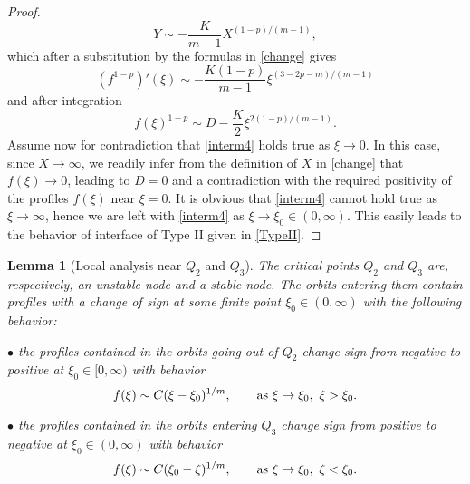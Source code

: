 \documentclass[a4paper,11pt]{article}
\newtheorem{lemma}[theorem]{Lemma}
\numberwithin{equation}{section}
\begin{document}
\begin{proof}
\begin{equation}
Y\sim-\frac{K}{m-1}X^{(1-p)/(m-1)},
\end{equation}
which after a substitution by the formulas in \eqref{change} gives
\begin{equation*}
(f^{1-p})'(\xi)\sim-\frac{K(1-p)}{m-1}\xi^{(3-2p-m)/(m-1)}
\end{equation*}
and after integration
\begin{equation}\label{interm4}
f(\xi)^{1-p}\sim D-\frac{K}{2}\xi^{2(1-p)/(m-1)}.
\end{equation}
Assume now for contradiction that \eqref{interm4} holds true as $\xi\to0$. In this case, since $X\to\infty$, we readily infer from the definition of $X$ in \eqref{change} that $f(\xi)\to0$, leading to $D=0$ and a contradiction with the required positivity of the profiles $f(\xi)$ near $\xi=0$. It is obvious that \eqref{interm4} cannot hold true as $\xi\to\infty$, hence we are left with \eqref{interm4} as $\xi\to\xi_0\in(0,\infty)$. This easily leads to the behavior of interface of Type II given in \eqref{TypeII}.
\end{proof}
\begin{lemma}[Local analysis near $Q_2$ and $Q_3$]\label{lem.Q23}
The critical points $Q_2$ and $Q_3$ are, respectively, an unstable node and a stable node. The orbits entering them contain profiles with a change of sign at some finite point $\xi_0\in(0,\infty)$ with the following behavior:

$\bullet$ the profiles contained in the orbits going out of $Q_2$ change sign from negative to positive at $\xi_0\in[0,\infty)$ with behavior
$$
f(\xi)\sim C(\xi-\xi_0)^{1/m}, \qquad {\rm as} \ \xi\to\xi_0, \ \xi>\xi_0.
$$

$\bullet$ the profiles contained in the orbits entering $Q_3$ change sign from positive to negative at $\xi_0\in(0,\infty)$ with behavior
$$
f(\xi)\sim C(\xi_0-\xi)^{1/m}, \qquad {\rm as} \ \xi\to\xi_0, \ \xi<\xi_0.
$$
\end{lemma}
\end{document}
